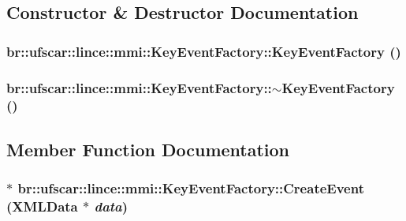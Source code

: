\subsection{Constructor \& Destructor Documentation}
\hypertarget{classbr_1_1ufscar_1_1lince_1_1mmi_1_1KeyEventFactory_ab4158dc9066513f282ee670c3f98d716}{
\subsubsection[{KeyEventFactory}]{\setlength{\rightskip}{0pt plus 5cm}br::ufscar::lince::mmi::KeyEventFactory::KeyEventFactory ()}}
\label{classbr_1_1ufscar_1_1lince_1_1mmi_1_1KeyEventFactory_ab4158dc9066513f282ee670c3f98d716}
\hypertarget{classbr_1_1ufscar_1_1lince_1_1mmi_1_1KeyEventFactory_afbe72c85a1c20525aa60055b4de36f12}{
\subsubsection[{$\sim$KeyEventFactory}]{\setlength{\rightskip}{0pt plus 5cm}br::ufscar::lince::mmi::KeyEventFactory::$\sim$KeyEventFactory ()}}
\label{classbr_1_1ufscar_1_1lince_1_1mmi_1_1KeyEventFactory_afbe72c85a1c20525aa60055b4de36f12}


\subsection{Member Function Documentation}
\hypertarget{classbr_1_1ufscar_1_1lince_1_1mmi_1_1KeyEventFactory_a838221bf5491967315a7475691e72103}{
\subsubsection[{CreateEvent}]{$\ast$ br::ufscar::lince::mmi::KeyEventFactory::CreateEvent ({\bf XMLData} $\ast$ {\em data})}}
\label{classbr_1_1ufscar_1_1lince_1_1mmi_1_1KeyEventFactory_a838221bf5491967315a7475691e72103}


